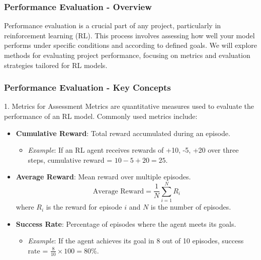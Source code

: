 \documentclass{beamer}
\begin{document}
\begin{frame}[fragile]
    \frametitle{Performance Evaluation - Overview}
    Performance evaluation is a crucial part of any project, particularly in reinforcement learning (RL). This process involves assessing how well your model performs under specific conditions and according to defined goals. We will explore methods for evaluating project performance, focusing on metrics and evaluation strategies tailored for RL models.
\end{frame}

\begin{frame}[fragile]
    \frametitle{Performance Evaluation - Key Concepts}
    \begin{block}{1. Metrics for Assessment}
        Metrics are quantitative measures used to evaluate the performance of an RL model. Commonly used metrics include:
        \begin{itemize}
            \item \textbf{Cumulative Reward}: Total reward accumulated during an episode.
                \begin{itemize}
                    \item \textit{Example}: If an RL agent receives rewards of +10, -5, +20 over three steps, cumulative reward = \(10 - 5 + 20 = 25\).
                \end{itemize}
            \item \textbf{Average Reward}: Mean reward over multiple episodes.
                \begin{equation}
                  \text{Average Reward} = \frac{1}{N} \sum_{i=1}^{N} R_i
                \end{equation}
                where \(R_i\) is the reward for episode \(i\) and \(N\) is the number of episodes.
            \item \textbf{Success Rate}: Percentage of episodes where the agent meets its goals.
                \begin{itemize}
                    \item \textit{Example}: If the agent achieves its goal in 8 out of 10 episodes, success rate = \( \frac{8}{10} \times 100 = 80\% \).
                \end{itemize}
        \end{itemize}
    \end{block}
\end{frame}
\end{document}
